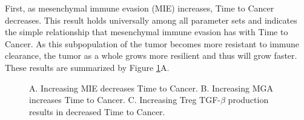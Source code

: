 \documentclass[11pt, a4paper, preprint]{article}
\begin{document}
First, as mesenchymal immune evasion (MIE) increases, Time to Cancer decreases.
This result holds universally among all parameter sets and indicates the simple relationship that mesenchymal immune evasion has with Time to Cancer.
As this subpopulation of the tumor becomes more resistant to immune clearance, the tumor as a whole grows more resilient and thus will grow faster.
These results are summarized by Figure \ref{fig:FirstSurvivalCurves}A.

\begin{figure}[H]
\center
{}
\caption{
A. Increasing MIE decreases Time to Cancer. 
B. Increasing MGA increases Time to Cancer.
C. Increasing Treg TGF-$\beta$ production results in decreased Time to Cancer.
}
\label{fig:FirstSurvivalCurves}
\end{figure}
\end{document}

